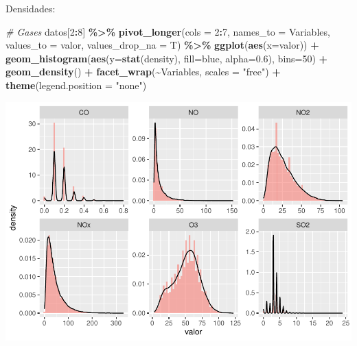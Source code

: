 \documentclass[notspecified,article,submit,moreauthors,pdftex]{Definitions/mdpi}
\newenvironment{Shaded}{\begin{snugshade}}{\end{snugshade}}
\newcommand{\AttributeTok}[1]{\textcolor[rgb]{0.13,0.29,0.53}{#1}}
\newcommand{\CommentTok}[1]{\textcolor[rgb]{0.56,0.35,0.01}{\textit{#1}}}
\newcommand{\DecValTok}[1]{\textcolor[rgb]{0.00,0.00,0.81}{#1}}
\newcommand{\FloatTok}[1]{\textcolor[rgb]{0.00,0.00,0.81}{#1}}
\newcommand{\FunctionTok}[1]{\textcolor[rgb]{0.13,0.29,0.53}{\textbf{#1}}}
\newcommand{\NormalTok}[1]{#1}
\newcommand{\SpecialCharTok}[1]{\textcolor[rgb]{0.81,0.36,0.00}{\textbf{#1}}}
\newcommand{\StringTok}[1]{\textcolor[rgb]{0.31,0.60,0.02}{#1}}
\begin{document}
Densidades:

\begin{Shaded}
\begin{Highlighting}[]
\CommentTok{\# Gases}
\NormalTok{datos[}\DecValTok{2}\SpecialCharTok{:}\DecValTok{8}\NormalTok{] }\SpecialCharTok{\%\textgreater{}\%}
  \FunctionTok{pivot\_longer}\NormalTok{(}\AttributeTok{cols =} \DecValTok{2}\SpecialCharTok{:}\DecValTok{7}\NormalTok{, }\AttributeTok{names\_to =} \StringTok{\textquotesingle{}Variables\textquotesingle{}}\NormalTok{, }\AttributeTok{values\_to =} \StringTok{\textquotesingle{}valor\textquotesingle{}}\NormalTok{, }\AttributeTok{values\_drop\_na =}\NormalTok{ T) }\SpecialCharTok{\%\textgreater{}\%}
  \FunctionTok{ggplot}\NormalTok{(}\FunctionTok{aes}\NormalTok{(}\AttributeTok{x=}\NormalTok{valor)) }\SpecialCharTok{+} 
  \FunctionTok{geom\_histogram}\NormalTok{(}\FunctionTok{aes}\NormalTok{(}\AttributeTok{y=}\FunctionTok{stat}\NormalTok{(density), }\AttributeTok{fill=}\StringTok{\textquotesingle{}blue\textquotesingle{}}\NormalTok{, }\AttributeTok{alpha=}\FloatTok{0.6}\NormalTok{), }\AttributeTok{bins=}\DecValTok{50}\NormalTok{) }\SpecialCharTok{+}
  \FunctionTok{geom\_density}\NormalTok{() }\SpecialCharTok{+}
  \FunctionTok{facet\_wrap}\NormalTok{(}\SpecialCharTok{\textasciitilde{}}\NormalTok{Variables, }\AttributeTok{scales =} \StringTok{"free"}\NormalTok{) }\SpecialCharTok{+} 
  \FunctionTok{theme}\NormalTok{(}\AttributeTok{legend.position =} \StringTok{"none"}\NormalTok{)}
\end{Highlighting}
\end{Shaded}

\includegraphics{ProyectoAED2023_plantilla_files/figure-latex/unnamed-chunk-14-1.pdf}
\end{document}
